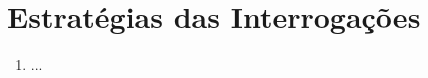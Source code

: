 \documentclass[a4paper, 10pt]{article}
\begin{document}
\section{Estratégias das Interrogações}
\label{sec:EI}
\begin{enumerate}
    \item ...










\end{enumerate}
\end{document}
